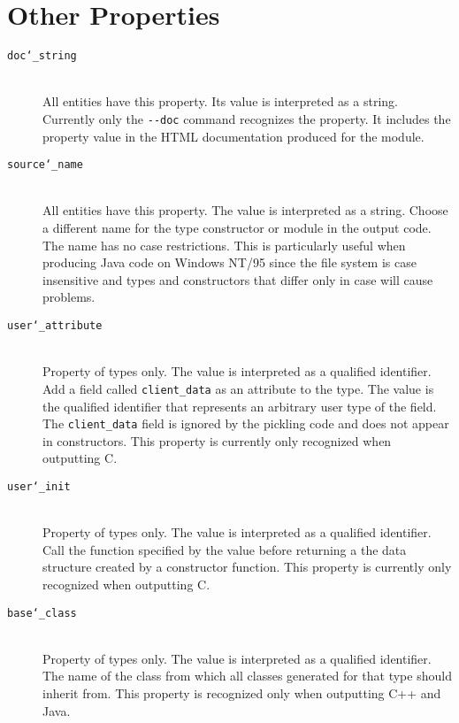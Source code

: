 \section{Other Properties}
\begin{description}
  \item[\texttt{doc\char`\_string}]\mbox{}\\
        All entities have this property. Its value is interpreted as a
        string. Currently only the \lstinline!--doc! command recognizes the
        property. It includes the property value in the HTML documentation
        produced for the module.
 
  \item[\texttt{source\char`\_name}]\mbox{}\\
        All entities have this property.  The value is interpreted as a
        string. Choose a different name for the type constructor or module
        in the output code. The name has no case restrictions. This is
        particularly useful when producing Java code on Windows NT/95 since
        the file system is case insensitive and types and constructors that
        differ only in case will cause problems.

  \item[\texttt{user\char`\_attribute}]\mbox{}\\
    Property of types only.	The value is interpreted as a qualified 
    identifier. Add a field called \lstinline!client_data! as an
    attribute to the type. The value is the qualified identifier that
    represents an arbitrary user type of the field. The \lstinline!client_data!
    field is ignored by the pickling code and does not appear in
    constructors. This property is currently only recognized when
    outputting C.

  \item[\texttt{user\char`\_init}]\mbox{}\\
    Property of types only. The value is interpreted as a qualified
    identifier. Call the function specified by the value before
    returning a the data structure created by a constructor function.
    This property is currently only recognized when outputting C.

  \item[\texttt{base\char`\_class}]\mbox{}\\
    Property of types only. The value is interpreted as a qualified
    identifier. The name of the class from which all classes generated
    for that type should inherit from. This property is recognized only
    when outputting C++ and Java.
    

\end{description}
